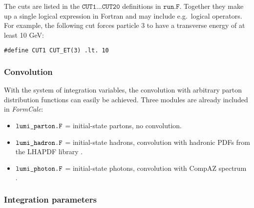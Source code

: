 \documentclass[twoside,11pt]{article}
\def\FC{\textit{FormCalc}}
\def\Code#1{\ensuremath{\texttt{#1}}}
\def\eg{e.g.\ }
\def\uscore{\symbol{95}}
\begin{document}
The cuts are listed in the \Code{CUT1}$\dots$\Code{CUT20} definitions in
\Code{run.F}.  Together they make up a single logical expression in 
Fortran and may include \eg logical operators.  For example, the
following cut forces particle 3 to have a transverse energy of at
least 10 GeV:
\begin{verbatim}
#define CUT1 CUT_ET(3) .lt. 10
\end{verbatim}


\subsubsection{Convolution}

With the system of integration variables, the convolution with arbitrary 
parton distribution functions can easily be achieved.  Three modules are
already included in \FC:
\begin{itemize}
\item \Code{lumi\uscore parton.F}
      = initial-state partons, no convolution.

\item \Code{lumi\uscore hadron.F}
      = initial-state hadrons,
      convolution with hadronic PDFs from the LHAPDF library 
      \cite{WhBG05}.

\item \Code{lumi\uscore photon.F}
      = initial-state photons,
      convolution with CompAZ spectrum \cite{Za03}.
\end{itemize}


\subsubsection{Integration parameters}
\end{document}
